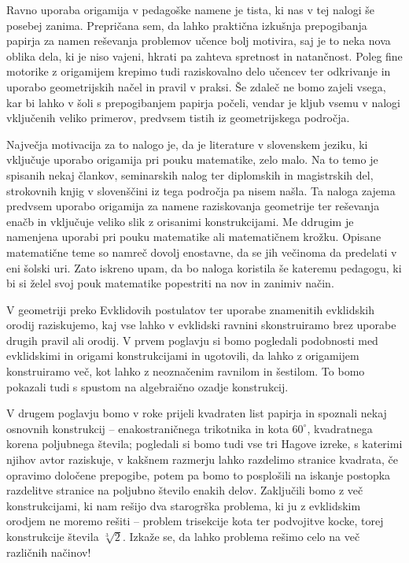 Ravno uporaba origamija v pedagoške namene je tista, ki nas v tej nalogi še posebej zanima. Prepričana sem, da lahko praktična izkušnja prepogibanja papirja za namen reševanja problemov učence bolj motivira, saj je to neka nova oblika dela, ki je niso vajeni, hkrati pa zahteva spretnost in natančnost. Poleg fine motorike z origamijem krepimo tudi raziskovalno delo učencev ter odkrivanje in uporabo geometrijskih načel in pravil v praksi. Še zdaleč ne bomo zajeli vsega, kar bi lahko v šoli s prepogibanjem papirja počeli, vendar je kljub vsemu v nalogi vključenih veliko primerov, predvsem tistih iz geometrijskega področja.

Največja motivacija za to nalogo je, da je literature v slovenskem jeziku, ki vključuje uporabo origamija pri pouku matematike, zelo malo. Na to temo je spisanih nekaj člankov, seminarskih nalog ter diplomskih in magistrskih del, strokovnih knjig v slovenščini iz tega področja pa nisem našla. Ta naloga zajema predvsem uporabo origamija za namene raziskovanja geometrije ter reševanja enačb in vključuje veliko slik z orisanimi konstrukcijami. Me ddrugim je namenjena uporabi pri pouku matematike ali matematičnem krožku. Opisane matematične teme so namreč dovolj enostavne, da se jih večinoma da predelati v eni šolski uri. Zato iskreno upam, da bo naloga koristila še kateremu pedagogu, ki bi si želel svoj pouk matematike popestriti na nov in zanimiv način.

V geometriji preko Evklidovih postulatov ter uporabe znamenitih evklidskih orodij raziskujemo, kaj vse lahko v evklidski ravnini skonstruiramo brez uporabe drugih pravil ali orodij. V prvem poglavju si bomo pogledali podobnosti med evklidskimi in origami konstrukcijami in ugotovili, da lahko z origamijem konstruiramo več, kot lahko z neoznačenim ravnilom in šestilom. To bomo pokazali tudi s spustom na algebraično ozadje konstrukcij.

V drugem poglavju bomo v roke prijeli kvadraten list papirja in spoznali nekaj osnovnih konstrukcij -- enakostraničnega trikotnika in kota $60^\circ$, kvadratnega korena poljubnega števila; pogledali si bomo tudi vse tri Hagove izreke, s katerimi njihov avtor raziskuje, v kakšnem razmerju lahko razdelimo stranice kvadrata, če opravimo določene prepogibe, potem pa bomo to posplošili na iskanje postopka razdelitve stranice na poljubno število enakih delov. Zaključili bomo z več konstrukcijami, ki nam rešijo dva starogrška problema, ki ju z evklidskim orodjem ne moremo rešiti -- problem trisekcije kota ter podvojitve kocke, torej konstrukcije števila $\sqrt[3]{2}$. Izkaže se, da lahko problema rešimo celo na več različnih načinov!

